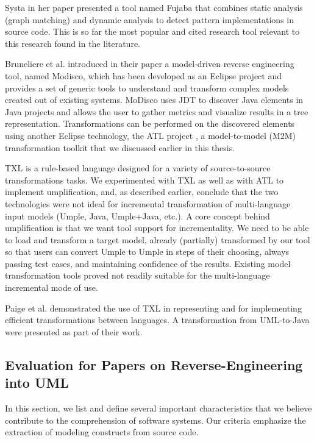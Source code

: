 Systa in her paper \cite{Systa} presented a tool named Fujaba \cite{Systa} that combines static analysis (graph matching) and dynamic analysis to detect pattern implementations in source code. This is so far the most popular and cited research tool relevant to this research found in the literature.

Bruneliere et al.\cite{ModiscoMain} introduced in their paper a model-driven reverse engineering tool, named Modisco, which has been developed as an Eclipse project and provides a set of generic tools to understand and transform complex models created out of existing systems. MoDisco uses JDT \cite{jdtProject} to discover Java elements in Java projects and allows the user to gather metrics and visualize results in a tree representation. Transformations can be performed on the discovered elements using another Eclipse technology, the ATL project \cite{jdtProject}, a model-to-model (M2M) transformation toolkit that we discussed earlier in this thesis.

TXL \cite{Cordy2006} is a rule-based language designed for a variety of source-to-source transformations tasks. We experimented with TXL as well as with ATL to implement  umplification, and, as described earlier, conclude that the two technologies were not ideal for incremental transformation of multi-language input models (Umple, Java, Umple+Java, etc.). A core concept behind umplification is that we want tool support for incrementality. We need to be able to load and transform a target model, already (partially) transformed by our tool so that users can convert Umple to Umple in steps of their choosing, always passing test cases, and maintaining confidence of the results. Existing model transformation tools proved not readily suitable for the multi-language incremental mode of use.

Paige et al. \cite{paigetowards} demonstrated the use of TXL in representing and for implementing efficient transformations between languages. A transformation from UML-to-Java were presented as part of their work. 

\subsection{Evaluation for Papers on Reverse-Engineering into UML}

 In this section, we list and define several important characteristics that we believe contribute to the comprehension of software systems. Our criteria emphasize the extraction of modeling constructs from source code.

